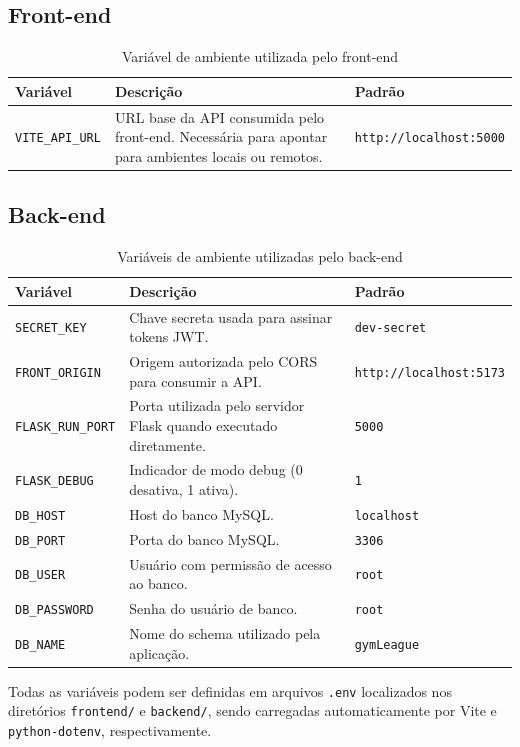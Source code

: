 \subsection{Front-end}
\begin{table}[H]
    \centering
    \begin{tabular}{|l|p{8cm}|l|}
        \hline
        \textbf{Variável} & \textbf{Descrição} & \textbf{Padrão} \\
        \hline
        \texttt{VITE\_API\_URL} & URL base da API consumida pelo front-end. Necessária para apontar para ambientes locais ou remotos. & \texttt{http://localhost:5000} \\
        \hline
    \end{tabular}
    \caption{Variável de ambiente utilizada pelo front-end}
\end{table}

\subsection{Back-end}
\begin{table}[H]
    \centering
    \begin{tabular}{|l|p{8cm}|l|}
        \hline
        \textbf{Variável} & \textbf{Descrição} & \textbf{Padrão} \\
        \hline
        \texttt{SECRET\_KEY} & Chave secreta usada para assinar tokens JWT. & \texttt{dev-secret} \\
        \hline
        \texttt{FRONT\_ORIGIN} & Origem autorizada pelo CORS para consumir a API. & \texttt{http://localhost:5173} \\
        \hline
        \texttt{FLASK\_RUN\_PORT} & Porta utilizada pelo servidor Flask quando executado diretamente. & \texttt{5000} \\
        \hline
        \texttt{FLASK\_DEBUG} & Indicador de modo debug (0 desativa, 1 ativa). & \texttt{1} \\
        \hline
        \texttt{DB\_HOST} & Host do banco MySQL. & \texttt{localhost} \\
        \hline
        \texttt{DB\_PORT} & Porta do banco MySQL. & \texttt{3306} \\
        \hline
        \texttt{DB\_USER} & Usuário com permissão de acesso ao banco. & \texttt{root} \\
        \hline
        \texttt{DB\_PASSWORD} & Senha do usuário de banco. & \texttt{root} \\
        \hline
        \texttt{DB\_NAME} & Nome do schema utilizado pela aplicação. & \texttt{gymLeague} \\
        \hline
    \end{tabular}
    \caption{Variáveis de ambiente utilizadas pelo back-end}
\end{table}

Todas as variáveis podem ser definidas em arquivos \texttt{.env} localizados nos diretórios \texttt{frontend/} e \texttt{backend/}, sendo carregadas automaticamente por Vite e \texttt{python-dotenv}, respectivamente.
